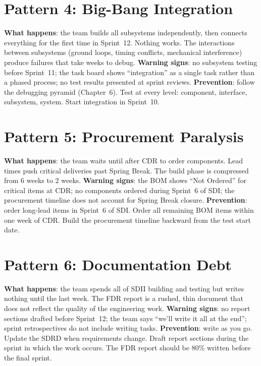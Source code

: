 \section*{Pattern 4: Big-Bang Integration}
\textbf{What happens}: the team builds all subsystems independently, then connects everything for the first time in Sprint~12. Nothing works. The interactions between subsystems (ground loops, timing conflicts, mechanical interference) produce failures that take weeks to debug.
\textbf{Warning signs}: no subsystem testing before Sprint~11; the task board shows ``integration'' as a single task rather than a phased process; no test results presented at sprint reviews.
\textbf{Prevention}: follow the debugging pyramid (Chapter~6). Test at every level: component, interface, subsystem, system. Start integration in Sprint~10.

\section*{Pattern 5: Procurement Paralysis}
\textbf{What happens}: the team waits until after CDR to order components. Lead times push critical deliveries past Spring Break. The build phase is compressed from 6 weeks to 2 weeks.
\textbf{Warning signs}: the BOM shows ``Not Ordered'' for critical items at CDR; no components ordered during Sprint~6 of SDI; the procurement timeline does not account for Spring Break closure.
\textbf{Prevention}: order long-lead items in Sprint~6 of SDI. Order all remaining BOM items within one week of CDR. Build the procurement timeline backward from the test start date.

\section*{Pattern 6: Documentation Debt}
\textbf{What happens}: the team spends all of SDII building and testing but writes nothing until the last week. The FDR report is a rushed, thin document that does not reflect the quality of the engineering work.
\textbf{Warning signs}: no report sections drafted before Sprint~12; the team says ``we'll write it all at the end''; sprint retrospectives do not include writing tasks.
\textbf{Prevention}: write as you go. Update the SDRD when requirements change. Draft report sections during the sprint in which the work occurs. The FDR report should be 80\% written before the final sprint.

